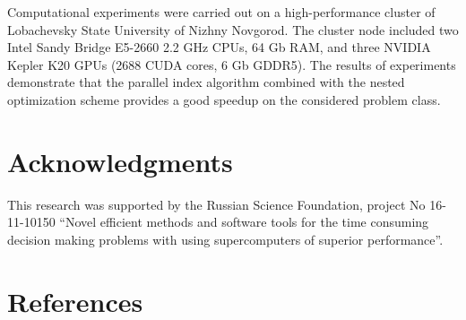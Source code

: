 \documentclass[a4paper]{jpconf}
\begin{document}
Computational experiments were carried out on a high-performance cluster of 
Lobachevsky State University of Nizhny Novgorod. The cluster node included 
two Intel Sandy Bridge E5-2660 2.2 GHz CPUs, 64 Gb RAM, and three NVIDIA 
Kepler K20 GPUs (2688 CUDA cores, 6 Gb GDDR5). 
The results of experiments demonstrate that the parallel index algorithm combined with the nested optimization scheme provides a good speedup on the considered problem class. 


\section*{Acknowledgments}
This research was supported by the Russian Science Foundation, project No 16-11-10150 ``Novel efficient methods
and software tools for the time consuming decision making problems with using supercomputers of superior performance''.

\bigskip

\section*{References}

\medskip
\end{document}

